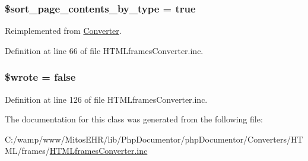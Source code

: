 \hypertarget{class_h_t_m_lframes_converter_ab5dae87e1968b35e37687a763216a835}{
\subsubsection[{\$sort\-\_\-page\-\_\-contents\-\_\-by\-\_\-type}]{\setlength{\rightskip}{0pt plus 5cm}\$sort\-\_\-page\-\_\-contents\-\_\-by\-\_\-type = true}}\label{class_h_t_m_lframes_converter_ab5dae87e1968b35e37687a763216a835}


\-Reimplemented from \hyperlink{class_converter_ab5dae87e1968b35e37687a763216a835}{\-Converter}.



\-Definition at line 66 of file \-H\-T\-M\-Lframes\-Converter.\-inc.

\hypertarget{class_h_t_m_lframes_converter_a2cf37faa5637b7639b816f3e61485a30}{
\subsubsection[{\$wrote}]{\setlength{\rightskip}{0pt plus 5cm}\$wrote = false}}\label{class_h_t_m_lframes_converter_a2cf37faa5637b7639b816f3e61485a30}


\-Definition at line 126 of file \-H\-T\-M\-Lframes\-Converter.\-inc.



\-The documentation for this class was generated from the following file\-:\begin{DoxyCompactItemize}
\item 
\-C\-:/wamp/www/\-Mitos\-E\-H\-R/lib/\-Php\-Documentor/php\-Documentor/\-Converters/\-H\-T\-M\-L/frames/\hyperlink{_h_t_m_lframes_converter_8inc}{\-H\-T\-M\-Lframes\-Converter.\-inc}\end{DoxyCompactItemize}
